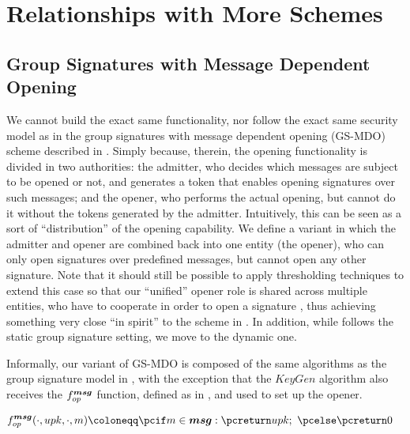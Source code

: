 \section{Relationships with More Schemes}
\label{app:related-extra}

\subsection{Group Signatures with Message Dependent Opening}
\label{sapp:related-models-gsmdo}

We cannot build the exact same functionality, nor follow the exact same security
model as in the group signatures with message dependent opening (GS-MDO) scheme
described in \cite{ehk+19}. Simply because, therein, the opening functionality
is divided in two authorities: the admitter, who decides which messages are
subject to be opened or not, and generates a token that enables opening
signatures over such messages; and the opener, who performs the actual opening,
but cannot do it without the tokens generated by the admitter. Intuitively,
this can be seen as a sort of ``distribution'' of the opening capability. We
define a variant in which the admitter and opener are combined
back into one entity (the opener), who can only open signatures over predefined
messages, but cannot open any other signature.
Note that it should still be possible to apply
thresholding techniques to extend this case so that our ``unified'' opener role
is shared across multiple entities, who have to cooperate in order to open a
signature \cite{cdl+20}, thus achieving something very close ``in spirit'' to
the scheme in \cite{ehk+19}. In addition, while \cite{ehk+19} follows the static
group signature setting, we move to the dynamic one.

Informally, our variant of GS-MDO is composed of the same algorithms as the
group signature model in , with the exception
that the $KeyGen$ algorithm also receives the $f_{op}^{\boldsymbol{msg}}$ function, defined
as in , and used to set up the opener.

\begin{align}
  & \finsp^{\smsg}(\cdot,\upk,\cdot,\msg) \coloneqq
    \pcif \msg \in \smsg: \pcreturn \upk;~\pcelse \pcreturn 0
    \label{eq:finspmsg}
\end{align}

